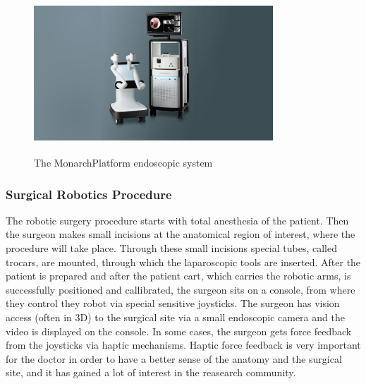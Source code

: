 \begin{center}
\begin{figure}[H]
\centering
\includegraphics[width=0.8\textwidth]{images/Moarch_Platform_1200_x_676_1_.jpg}\\
\caption[The Monarch\textsuperscript \texttrademark Platform endoscopic system]{The Monarch\textsuperscript \texttrademark Platform endoscopic system \footnotemark}
\end{figure}
\end{center}


\subsubsection{Surgical Robotics Procedure}

The robotic surgery procedure starts with total anesthesia of the patient. Then the surgeon makes small incisions at the anatomical region of interest, where the procedure will take place. Through 
these small incisions special tubes, called trocars, are mounted, through which the laparoscopic tools are inserted. After the patient is prepared and after the patient cart, which carries the robotic arms, 
is successfully positioned and callibrated, the surgeon sits on a console, from where they control they robot via special sensitive joysticks. The surgeon has vision access (often in 3D) to the surgical site via a
small endoscopic camera and the video is displayed on the console. In some cases, the surgeon gets force feedback from the joysticks via haptic mechanisms. Haptic force feedback is very important for the doctor 
in order to have a better sense of the anatomy and the surgical site, and it has gained a lot of interest in the reasearch community.

